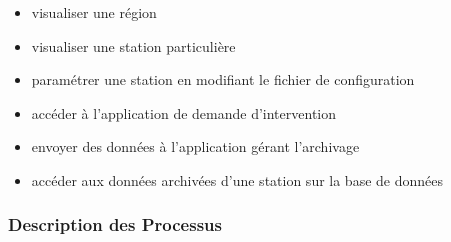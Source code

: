 \documentclass [a4paper] {article}
\begin{document}
\begin{itemize}
\item   visualiser une région \\
\item	visualiser une station particulière \\
\item	paramétrer une station en modifiant le fichier de configuration \\
\item	accéder à l'application de demande d'intervention \\
\item	envoyer des données à l'application gérant l'archivage\\ 
\item	accéder aux données archivées d'une station sur la base de données\\
\end{itemize}


\subsubsection{Description des Processus}
\end{document}
